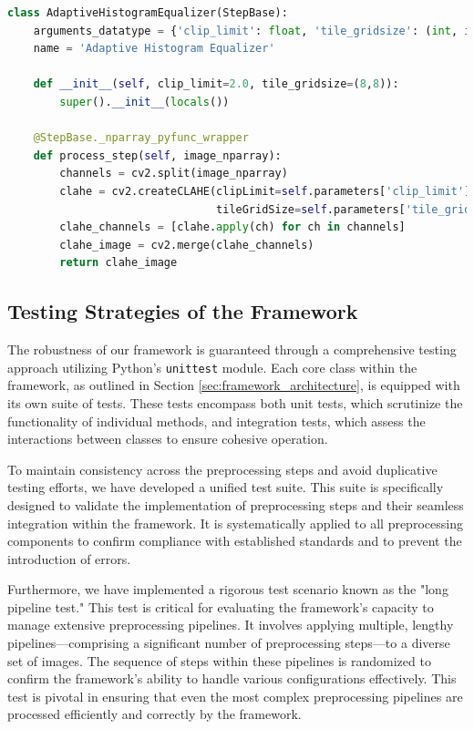 \documentclass[journal ]{new-aiaa}
\begin{document}
\begin{lstlisting}[language=Python, caption=Example of a Preprocessing Step Implementation, label=lst:preprocessing_step]
class AdaptiveHistogramEqualizer(StepBase):
    arguments_datatype = {'clip_limit': float, 'tile_gridsize': (int, int)}
    name = 'Adaptive Histogram Equalizer'

    def __init__(self, clip_limit=2.0, tile_gridsize=(8,8)):
        super().__init__(locals())

    @StepBase._nparray_pyfunc_wrapper
    def process_step(self, image_nparray):
        channels = cv2.split(image_nparray)
        clahe = cv2.createCLAHE(clipLimit=self.parameters['clip_limit'],
                                tileGridSize=self.parameters['tile_gridsize'])
        clahe_channels = [clahe.apply(ch) for ch in channels]
        clahe_image = cv2.merge(clahe_channels)
        return clahe_image
\end{lstlisting}

\subsection{Testing Strategies of the Framework}
The robustness of our framework is guaranteed through a comprehensive testing approach utilizing Python's \texttt{unittest} module. Each core class within the framework, as outlined in Section \ref{sec:framework_architecture}, is equipped with its own suite of tests. These tests encompass both unit tests, which scrutinize the functionality of individual methods, and integration tests, which assess the interactions between classes to ensure cohesive operation.

To maintain consistency across the preprocessing steps and avoid duplicative testing efforts, we have developed a unified test suite. This suite is specifically designed to validate the implementation of preprocessing steps and their seamless integration within the framework. It is systematically applied to all preprocessing components to confirm compliance with established standards and to prevent the introduction of errors.

Furthermore, we have implemented a rigorous test scenario known as the "long pipeline test." This test is critical for evaluating the framework's capacity to manage extensive preprocessing pipelines. It involves applying multiple, lengthy pipelines—comprising a significant number of preprocessing steps—to a diverse set of images. The sequence of steps within these pipelines is randomized to confirm the framework's ability to handle various configurations effectively. This test is pivotal in ensuring that even the most complex preprocessing pipelines are processed efficiently and correctly by the framework.
\end{document}
